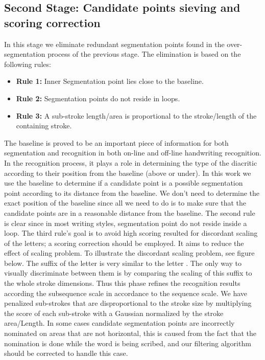 \documentclass[journal,compsoc]{IEEEtran}
\begin{document}
\subsection{Second  Stage: Candidate points sieving and scoring correction}
In this stage we eliminate redundant segmentation points found in the over-segmentation process of the previous stage. The elimination is based on the following rules:

\begin{itemize}
	\item[] \textbf{Rule 1:} Inner Segmentation point lies close to the baseline. 
	\item[] \textbf{Rule 2:} Segmentation points do not reside in loops.
	\item[] \textbf{Rule 3:} A sub-stroke length/area is proportional to the stroke/length of the containing stroke.
\end{itemize}

The baseline is proved to be an important piece of information for both segmentation and recognition in both on-line and off-line handwriting recognition. In the recognition process, it plays a role in determining the type of the diacritic according to their position from the baseline (above or under). In this work we use the baseline to determine if a candidate point is a possible segmentation point according to its distance from the baseline. We don't need to determine the exact position of the baseline since all we need to do is to make sure that the candidate points are in a reasonable distance from the baseline.
The second rule is clear since in most writing styles, segmentation point do not reside inside a loop.
The third rule's goal is to avoid high scoring resulted for discordant scaling of the letters; a scoring correction should be employed. It aims to reduce the effect of scaling problem. To illustrate the discordant scaling problem, see figure below. The suffix of the letter  is very similar to the letter . The only way to visually discriminate between them is by comparing the scaling of this suffix to the whole stroke dimensions. Thus this phase refines the recognition results according the subsequence scale in accordance to the sequence scale. We have penalized sub-strokes that are disproportional to the stroke size by multiplying the score of each sub-stroke with a Gaussian normalized by the stroke area/Length.
In some cases candidate segmentation points are incorrectly nominated on areas that are not horizontal, this is caused from the fact that the nomination is done while the word is being scribed, and our filtering algorithm should be corrected to handle this case.
\end{document}
